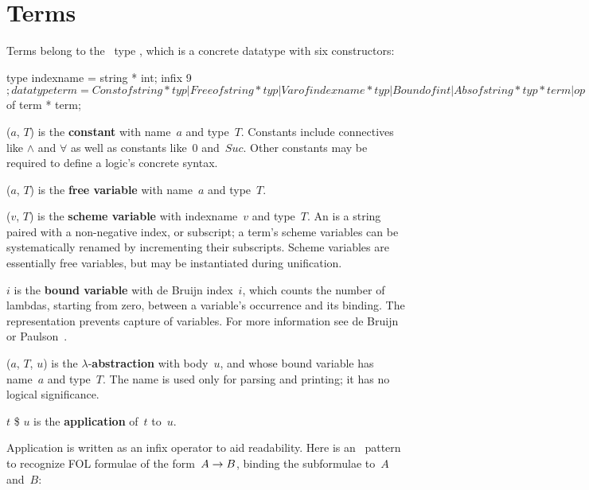\section{Terms}\label{sec:terms}
Terms belong to the \ML\ type , which is a concrete datatype
with six constructors:
\begin{ttbox}
type indexname = string * int;
infix 9 $;
datatype term = Const of string * typ
              | Free  of string * typ
              | Var   of indexname * typ
              | Bound of int
              | Abs   of string * typ * term
              | op $  of term * term;
\end{ttbox}
\begin{ttdescription}
\item[\ttindexbold{Const} ($a$, $T$)] 
  is the \textbf{constant} with name~$a$ and type~$T$.  Constants include
  connectives like $\land$ and $\forall$ as well as constants like~0
  and~$Suc$.  Other constants may be required to define a logic's concrete
  syntax.

\item[\ttindexbold{Free} ($a$, $T$)] 
  is the \textbf{free variable} with name~$a$ and type~$T$.

\item[\ttindexbold{Var} ($v$, $T$)] 
  is the \textbf{scheme variable} with indexname~$v$ and type~$T$.  An
   is a string paired with a non-negative index, or
  subscript; a term's scheme variables can be systematically renamed by
  incrementing their subscripts.  Scheme variables are essentially free
  variables, but may be instantiated during unification.

\item[\ttindexbold{Bound} $i$] 
  is the \textbf{bound variable} with de Bruijn index~$i$, which counts the
  number of lambdas, starting from zero, between a variable's occurrence
  and its binding.  The representation prevents capture of variables.  For
  more information see de Bruijn \cite{debruijn72} or
  Paulson~\cite[page~376]{paulson-ml2}.

\item[\ttindexbold{Abs} ($a$, $T$, $u$)]
  is the $\lambda$-\textbf{abstraction} with body~$u$, and whose bound
  variable has name~$a$ and type~$T$.  The name is used only for parsing
  and printing; it has no logical significance.

\item[$t$ \$ $u$]  
is the \textbf{application} of~$t$ to~$u$.
\end{ttdescription}
Application is written as an infix operator to aid readability.  Here is an
\ML\ pattern to recognize FOL formulae of the form~$A\rightarrow B$, binding the
subformulae to~$A$ and~$B$:


